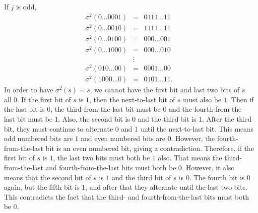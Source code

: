 If $j$ is odd,
\begin{eqnarray}
	\sigma^2 (0 \ldots 0 0 0 1) & = & 0 1 1 1 \ldots 1 1  \nonumber \\
	\sigma^2 (0 \ldots 0 0 1 0) & = & 1 1 1 1 \ldots 1 1 \nonumber \\
	\sigma^2 (0 \ldots 0 1 0 0) & = & 0 0 0 \ldots 0 0 1 \nonumber \\
	\sigma^2 (0 \ldots 1 0 0 0) & = & 0 0 0 \ldots 0 1 0 \\
	& \vdots & \nonumber \\
	\sigma^2 (0 1 0 \ldots 0 0) & = & 0 0 0 1 \ldots 0 0 \nonumber \\
	\sigma^2 (1 0 0 0 \ldots 0) & = & 0 1 0 1 \ldots 1 1. \nonumber
\end{eqnarray}
In order to have $\sigma^2 (s) = s$, we cannot have the first bit and last
two bits of $s$ all $0$.  If the first bit of $s$ is $1$, then the next-to-last
bit of $s$ must also be $1$.  Then if the last bit is $0$, the
third-from-the-last bit must be $0$ and the fourth-from-the-last bit must
be $1$.  Also, the second bit is $0$ and the third bit is $1$.  After the third
bit, they must continue to alternate $0$ and $1$ until the next-to-last bit.
This means odd numbered bits are $1$ and even numbered bits are $0$.
However, the fourth-from-the-last bit is an even numbered bit, giving a
contradiction.  Therefore, if the first bit of $s$ is $1$, the last two bits
must both be $1$ also.  That means the third-from-the-last and
fourth-from-the-last bits must both be $0$.  However, it also means that
the second bit of $s$ is $1$ and the third bit of $s$ is $0$.  The fourth bit
is $0$ again, but the fifth bit is $1$, and after that they alternate until the
last two bits.  This contradicts the fact that the third- and
fourth-from-the-last bits must both be $0$.


